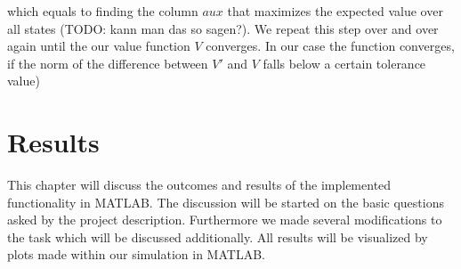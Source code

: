 \documentclass[12pt, a4paper, oneside]{article}
\begin{document}
which equals to finding the column $aux$ that maximizes the expected value over all states (TODO: kann man das so sagen?).
We repeat this step over and over again until the our value function $V$ converges.
In our case the function converges, if the norm of the difference between $V'$ and $V$ falls below a certain tolerance value) \\


\newpage
\section{Results}
This chapter will discuss the outcomes and results of the implemented functionality in MATLAB.
The discussion will be started on the basic questions asked by the project description.
Furthermore we made several modifications to the task which will be discussed additionally.
All results will be visualized by plots made within our simulation in MATLAB.
\end{document}
